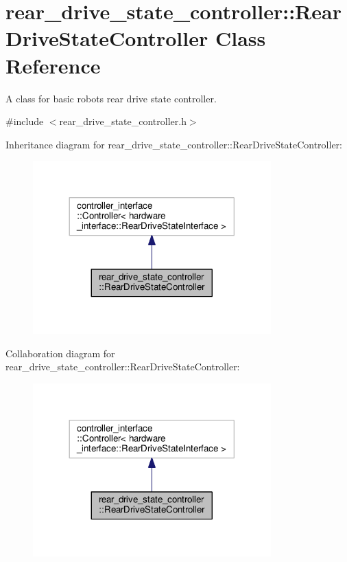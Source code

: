 \hypertarget{classrear__drive__state__controller_1_1RearDriveStateController}{}\section{rear\+\_\+drive\+\_\+state\+\_\+controller\+:\+:Rear\+Drive\+State\+Controller Class Reference}
\label{classrear__drive__state__controller_1_1RearDriveStateController}


A class for basic robot\textquotesingle{}s rear drive state controller.  




{\ttfamily \#include $<$rear\+\_\+drive\+\_\+state\+\_\+controller.\+h$>$}



Inheritance diagram for rear\+\_\+drive\+\_\+state\+\_\+controller\+:\+:Rear\+Drive\+State\+Controller\+:\nopagebreak
\begin{figure}[H]
\begin{center}
\leavevmode
\includegraphics[width=260pt]{classrear__drive__state__controller_1_1RearDriveStateController__inherit__graph}
\end{center}
\end{figure}


Collaboration diagram for rear\+\_\+drive\+\_\+state\+\_\+controller\+:\+:Rear\+Drive\+State\+Controller\+:\nopagebreak
\begin{figure}[H]
\begin{center}
\leavevmode
\includegraphics[width=260pt]{classrear__drive__state__controller_1_1RearDriveStateController__coll__graph}
\end{center}
\end{figure}

